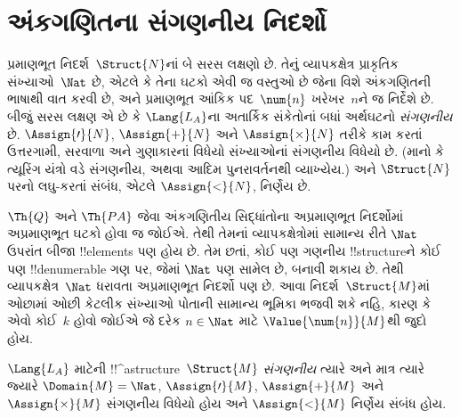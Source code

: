 \documentclass[../../../include/open-logic-section]{subfiles}
\begin{document}
\section{અંકગણિતના સંગણનીય નિદર્શો}

\begin{explain}
પ્રમાણભૂત નિદર્શ~$\Struct{N}$નાં બે સરસ લક્ષણો છે. તેનું
વ્યાપકક્ષેત્ર પ્રાકૃતિક સંખ્યાઓ~$\Nat$ છે, એટલે કે તેના ઘટકો એવી જ
વસ્તુઓ છે જેના વિશે અંકગણિતની ભાષાથી વાત કરવી છે, અને પ્રમાણભૂત આંકિક
પદ~$\num{n}$ ખરેખર~$n$ને જ નિર્દેશે છે. બીજું સરસ લક્ષણ એ છે કે
$\Lang{L_A}$ના અતાર્કિક સંકેતોનાં બધાં અર્થઘટનો \emph{સંગણનીય} છે.
$\Assign{\prime}{N}$, $\Assign{+}{N}$ અને $\Assign{\times}{N}$ તરીકે
કામ કરતાં ઉત્તરગામી, સરવાળા અને ગુણાકારનાં વિધેયો સંખ્યાઓનાં સંગણનીય
વિધેયો છે. (માનો કે ત્યૂરિંગ યંત્રો વડે સંગણનીય, અથવા આદિમ
પુનરાવર્તનથી વ્યાખ્યેય.) અને $\Struct{N}$ પરનો લઘુ-કરતાં સંબંધ, એટલે
$\Assign{<}{N}$, નિર્ણેય છે.

$\Th{Q}$ અને $\Th{PA}$ જેવા અંકગણિતીય સિદ્ધાંતોના અપ્રમાણભૂત
નિદર્શોમાં અપ્રમાણભૂત ઘટકો હોવા જ જોઈએ. તેથી તેમનાં વ્યાપકક્ષેત્રોમાં
સામાન્ય રીતે $\Nat$ ઉપરાંત બીજા !!{element}s પણ હોય છે. તેમ છતાં, કોઈ
પણ ગણનીય !!{structure}ને કોઈ પણ !!{denumerable} ગણ પર, જેમાં $\Nat$
પણ સામેલ છે, બનાવી શકાય છે. તેથી વ્યાપકક્ષેત્ર~$\Nat$ ધરાવતા
અપ્રમાણભૂત નિદર્શો પણ છે. આવા નિદર્શ~$\Struct{M}$માં ઓછામાં ઓછી કેટલીક
સંખ્યાઓ પોતાની સામાન્ય ભૂમિકા ભજવી શકે નહિ, કારણ કે એવો કોઈ~$k$ હોવો
જોઈએ જે દરેક $n\in\Nat$ માટે $\Value{\num{n}}{M}$થી જુદો હોય.
\end{explain}

\begin{defn}
$\Lang{L_A}$ માટેની !!^a{structure}~$\Struct{M}$ \emph{સંગણનીય}
ત્યારે અને માત્ર ત્યારે જ્યારે $\Domain{M}=\Nat$,
$\Assign{\prime}{M}$, $\Assign{+}{M}$ અને $\Assign{\times}{M}$
સંગણનીય વિધેયો હોય અને $\Assign{<}{M}$ નિર્ણેય સંબંધ હોય.
\end{defn}
\end{document}
